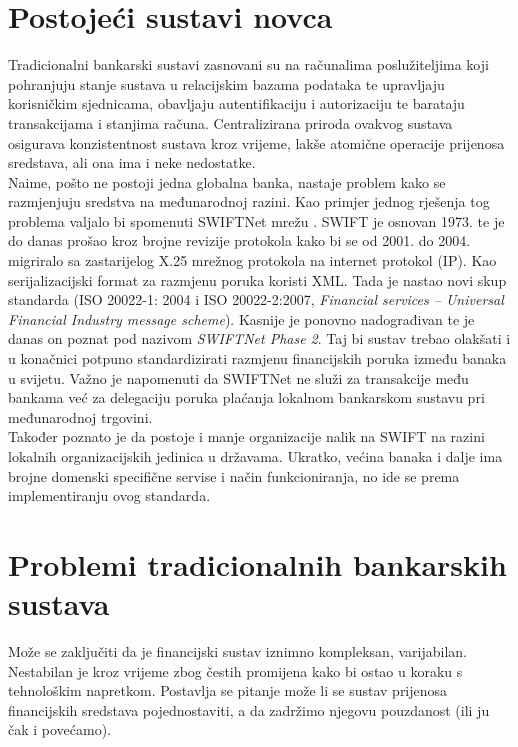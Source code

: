 \documentclass[utf8, zavrsni]{fer}
\begin{document}
\section{Postojeći sustavi novca}
Tradicionalni bankarski sustavi zasnovani su na računalima poslužiteljima koji pohranjuju stanje sustava u relacijskim bazama podataka te upravljaju korisničkim sjednicama, obavljaju autentifikaciju i autorizaciju te barataju transakcijama i stanjima računa. Centralizirana priroda ovakvog sustava osigurava konzistentnost sustava kroz vrijeme, lakše atomične operacije prijenosa sredstava, ali ona ima i neke nedostatke. \\
Naime, pošto ne postoji jedna globalna banka, nastaje problem kako se razmjenjuju sredstva na međunarodnoj razini. Kao primjer jednog rješenja tog problema valjalo bi spomenuti SWIFTNet mrežu \cite{enwiki:1021608159}. SWIFT je osnovan 1973. te je do danas prošao kroz brojne revizije protokola kako bi se od 2001. do 2004. migriralo sa zastarijelog X.25 mrežnog protokola na internet protokol (IP). Kao serijalizacijski format za razmjenu poruka koristi XML. Tada je nastao novi skup standarda (ISO 20022-1: 2004 i ISO 20022-2:2007, \textit{Financial services – Universal Financial Industry message scheme}). Kasnije je ponovno nadograđivan te je danas on poznat pod nazivom \textit{SWIFTNet Phase 2}. Taj bi sustav trebao olakšati i u konačnici potpuno standardizirati razmjenu financijskih poruka između banaka u svijetu. Važno je napomenuti da SWIFTNet ne služi za transakcije među bankama već za delegaciju poruka plaćanja lokalnom bankarskom sustavu pri međunarodnoj trgovini. \\ 

Također poznato je da postoje i manje organizacije nalik na SWIFT na razini lokalnih organizacijskih jedinica u državama. Ukratko, većina banaka i dalje ima brojne domenski specifične servise i način funkcioniranja, no ide se prema implementiranju ovog standarda.

\section{Problemi tradicionalnih bankarskih sustava}
	
Može se zaključiti da je financijski sustav iznimno kompleksan, varijabilan. Nestabilan je kroz vrijeme zbog čestih promijena kako bi ostao u koraku s tehnološkim napretkom. Postavlja se pitanje može li se sustav prijenosa financijskih sredstava pojednostaviti, a da zadržimo njegovu pouzdanost (ili ju čak i povećamo). \\
\end{document}
